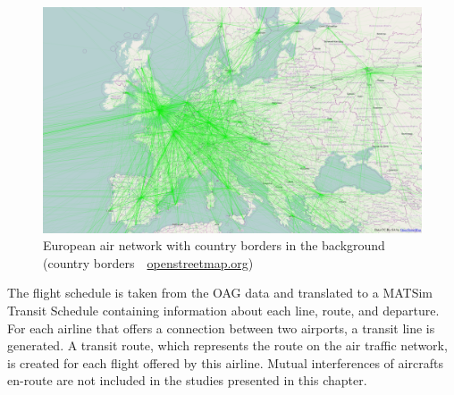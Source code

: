 \begin{figure}[t]
\begin{center}
  \includegraphics[width=\linewidth]{extending/figures/air/air_network_europe_osm.png}
\end{center}
\caption[European air network]{European air network with country borders in the background (country borders~\textcopyright~\url{openstreetmap.org})}
  \label{fig:matsim_air_network_eu}
\end{figure}

The flight schedule is taken from the OAG data and translated to a MATSim Transit Schedule containing information about each line, route, and departure. 
For each airline that offers a connection between two airports, a transit line is generated. 
A transit route, which represents the route on the air traffic network, is created for each flight offered by this airline. 
Mutual interferences of aircrafts en-route are not included in the studies presented in this chapter.

